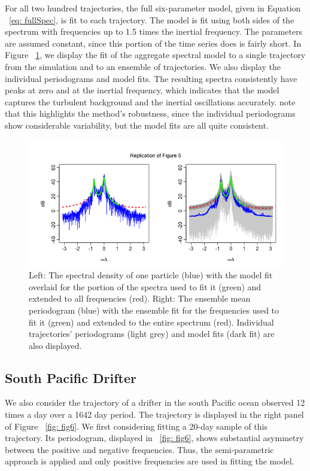 \documentclass{stat572Style}
\begin{document}
\par For all two hundred trajectories, the full six-parameter model, given in Equation ~\ref{eq: fullSpec}, is fit to each trajectory. 
The model is fit using both sides of the spectrum with frequencies up to 1.5 times the inertial frequency. 
The parameters are assumed constant, since this portion of the time series does is fairly short. 
In Figure ~\ref{fig: fig5}, we display the fit of the aggregate spectral model to a single trajectory from the simulation and to an ensemble of trajectories. 
We also display the individual periodograms and model fits. 
The resulting spectra consistently have peaks at zero and at the inertial frequency, which indicates that the model captures the turbulent background and the inertial oscillations accurately. 
\citet{Sykulski2016}  note that this highlights the method's robustness, since the individual periodograms show considerable variability, but the model fits are all quite consistent.

\begin{figure}[h!]
  \centering
    \includegraphics[width=.8\textwidth]{ReplicatedFigures/fig5.png}
        \caption{Left: The spectral density of one particle (blue) with the model fit overlaid for the portion of the spectra used to fit it (green) and extended to all frequencies (red). Right: The ensemble mean periodogram (blue) with the ensemble fit for the frequencies used to fit it (green) and extended to the entire spectrum (red). Individual trajectories' periodograms (light grey) and model fits (dark fit) are also displayed. }
        \label{fig: fig5}
\end{figure}

\subsection{South Pacific Drifter}
\label{sec: spDrift}
We also consider the trajectory of a drifter in the south Pacific ocean observed 12 times a day over a 1642 day period.  
The trajectory is displayed in the right panel of Figure ~\ref{fig: fig6}. 
We first considering fitting a 20-day sample of this trajectory. 
Its periodogram, displayed in ~\ref{fig: fig6}, shows substantial asymmetry between the positive and negative frequencies. Thus, the semi-parametric approach is applied and only positive frequencies are used in fitting the model. 
\end{document}
